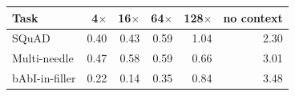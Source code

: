 \begin{tabular}{lrrrr|r}
\toprule
Task & 4$\times$ & 16$\times$ & 64$\times$ & 128$\times$ & no context \\
\midrule
SQuAD & 0.40 & 0.43 & 0.59 & 1.04 & 2.30 \\
Multi-needle & 0.47 & 0.58 & 0.59 & 0.66 & 3.01 \\
bAbI-in-filler & 0.22 & 0.14 & 0.35 & 0.84 & 3.48 \\
\bottomrule
\end{tabular}

